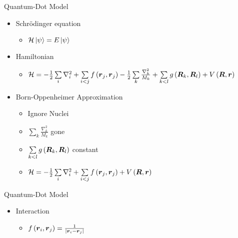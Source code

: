 \documentclass[10pt, t, xcolor=dvipsnames]{beamer}
\begin{document}
\begin{frame}[fragile]{Quantum-Dot Model}
    \begin{itemize}
        \item Schrödinger equation 
            \begin{itemize}
                \item $\mathcal{H}\ket{\psi} = E\ket{\psi}$
            \end{itemize}
        \item Hamiltonian
            \begin{itemize}
                \item $\mathcal{H} = - \frac{1}{2} \sum\limits_i \nabla^2_i +
                    \sum\limits_{i<j} f\left(\bm{{r}}_j, \bm{{r}}_j\right) -
                    \frac{1}{2} \sum\limits_k \frac{\nabla^2_k}{M_k} + \sum\limits_{k<l}
                    g\left(\bm{{R}}_k,\bm{{R}}_l\right) +
                    V\left(\bm{{R}},\bm{{r}}\right)$
            \end{itemize}
        \item Born-Oppenheimer Approximation
            \begin{itemize}
                \item Ignore Nuclei
                \item $\sum\limits_k \frac{\nabla^2_k}{M_k}$ gone
                \item $\sum\limits_{k<l} g\left(\bm{{R}}_k,\bm{{R}}_l\right)$ constant
                \item $\mathcal{H} = - \frac{1}{2} \sum\limits_i \nabla^2_i +
                    \sum\limits_{i<j} f\left(\bm{{r}}_j, \bm{{r}}_j\right) +
                    V\left(\bm{{R}},\bm{{r}}\right)$
            \end{itemize}
    \end{itemize}
\end{frame}

\begin{frame}[fragile]{Quantum-Dot Model}
    \begin{itemize}
        \item Interaction
            \begin{itemize}
                \item $f\left(\bm{{r}}_i, \bm{{r}}_j\right) =
                    \frac{1}{\abs{\bm{{r}}_i - \bm{{r}}_j}}$
            \end{itemize}
    \end{itemize}
\end{frame}
\end{document}
